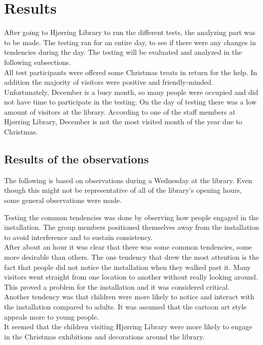 \section{Results}
After going to Hj{\o}rring Library to run the different tests, the analyzing part was to be made. The testing ran for an entire day, to see if there were any changes in tendencies during the day. The testing will be evaluated and analyzed in the following subsections.\\
All test participants were offered some Christmas treats in return for the help. In addition the majority of visitors were positive and friendly-minded. Unfortunately, December is a busy month, so many people were occupied and did not have time to participate in the testing. On the day of testing there was a low amount of visitors at the library. According to one of the staff members at Hj{\o}rring Library, December is not the most visited month of the year due to Christmas.

\subsection{Results of the observations}
The following is based on observations during a Wednesday at the library. Even though this might not be representative of all of the library's opening hours, some general observations were made.

Testing the common tendencies was done by observing how people engaged in the installation. The group members positioned themselves away from the installation to avoid interference and to sustain consistency.\\ 
After about an hour it was clear that there was some common tendencies, some more desirable than others. The one tendency that drew the most attention is the fact that people did not notice the installation when they walked past it. Many visitors went straight from one location to another without really looking around. This proved a problem for the installation and it was considered critical.\\
Another tendency was that children were more likely to notice and interact with the installation compared to adults. It was assumed that the cartoon art style appeals more to young people.\\
It seemed that the children visiting Hj{\o}rring Library were more likely to engage in the Christmas exhibitions and decorations around the library.

